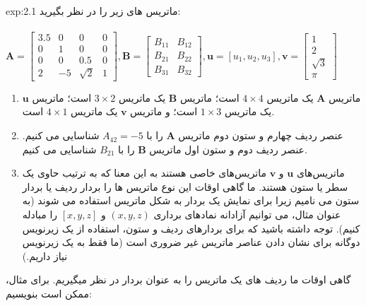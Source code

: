 {\begin{spacing}{1.5}
        \begin{example}{exp:2.1}
            \Large
            ماتریس های زیر را در نظر بگیرید:\\\\
            $\textbf{A}=\begin{bmatrix}
                            3.5 & 0  & 0                      & 0 \\
                            0   & 1  & 0                      & 0 \\
                            0   & 0  & 0.5                    & 0 \\
                            2   & -5 & \sqrt{\displaystyle 2} & 1
            \end{bmatrix}, \textbf{B}=\begin{bmatrix}
                                          B_{11} & B_{12} \\
                                          B_{21} & B_{22} \\
                                          B_{31} & B_{32}
            \end{bmatrix}, \textbf{u}=[u_{1},u_{2},u_{3}], \textbf{v}=\begin{bmatrix}
                                                                          1                      \\
                                                                          2                      \\
                                                                          \sqrt{\displaystyle 3} \\
                                                                          \pi
            \end{bmatrix}$
            \\
            \begin{enumerate}[label=\textbf{\arabic*}.]
                \item {ماتریس $\textbf{A}$ یک ماتریس $4\times 4$ است؛
                ماتریس $\textbf{B}$ یک ماتریس $3\times 2$ است؛
                ماتریس $\textbf{u}$ یک ماتریس $1\times 3$ است؛
                و ماتریس $\textbf{v}$ یک ماتریس $4\times 1$ است.}
                \item {عنصر ردیف چهارم و ستون دوم ماتریس $\textbf{A}$ را با $A_{42}=-5$ شناسایی می کنیم. عنصر ردیف دوم و ستون اول ماتریس $\textbf{B}$ را با $B_{21}$ شناسایی می کنیم.}
                \item {ماتریس‌های $\textbf{u}$ و $\textbf{v}$ ماتریس‌های خاصی هستند به این معنا که به ترتیب حاوی یک سطر یا ستون هستند.
                ما گاهی اوقات این نوع ماتریس ها را بردار ردیف یا بردار ستون می نامیم زیرا برای نمایش یک بردار به شکل ماتریس استفاده می شوند
                    (به عنوان مثال، می توانیم آزادانه نمادهای برداری $(x, y, z)$ و $[x, y, z]$ را مبادله کنیم).
                    توجه داشته باشید که برای بردارهای ردیف و ستون، استفاده از یک زیرنویس دوگانه برای نشان دادن عناصر ماتریس غیر ضروری است (ما فقط به یک زیرنویس نیاز داریم.)}
            \end{enumerate}
            گاهی اوقات ما ردیف های یک ماتریس را به عنوان بردار در نظر میگیریم. برای مثال، ممکن است بنویسیم:


\end{example}
\end{spacing}}
